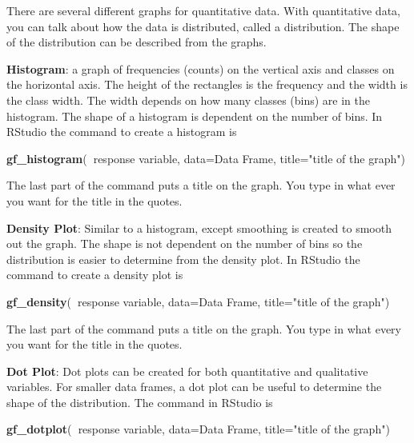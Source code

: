 \documentclass[
]{book}
\newenvironment{Shaded}{\begin{snugshade}}{\end{snugshade}}
\newcommand{\DataTypeTok}[1]{\textcolor[rgb]{0.13,0.29,0.53}{#1}}
\newcommand{\KeywordTok}[1]{\textcolor[rgb]{0.13,0.29,0.53}{\textbf{#1}}}
\newcommand{\NormalTok}[1]{#1}
\newcommand{\OperatorTok}[1]{\textcolor[rgb]{0.81,0.36,0.00}{\textbf{#1}}}
\newcommand{\StringTok}[1]{\textcolor[rgb]{0.31,0.60,0.02}{#1}}
\begin{document}
There are several different graphs for quantitative data. With quantitative data, you can talk about how the data is distributed, called a distribution. The shape of the distribution can be described from the graphs.

\textbf{Histogram}: a graph of frequencies (counts) on the vertical axis and classes on the horizontal axis. The height of the rectangles is the frequency and the width is the class width. The width depends on how many classes (bins) are in the histogram. The shape of a histogram is dependent on the number of bins. In RStudio the command to create a histogram is

\begin{Shaded}
\begin{Highlighting}[]
\KeywordTok{gf_histogram}\NormalTok{(}\OperatorTok{~}\NormalTok{response variable, }\DataTypeTok{data=}\NormalTok{Data Frame, }\DataTypeTok{title=}\StringTok{"title }
\StringTok{of the graph"}\NormalTok{)}
\end{Highlighting}
\end{Shaded}

The last part of the command puts a title on the graph. You type in what ever you want for the title in the quotes.

\textbf{Density Plot}: Similar to a histogram, except smoothing is created to smooth out the graph. The shape is not dependent on the number of bins so the distribution is easier to determine from the density plot. In RStudio the command to create a density plot is

\begin{Shaded}
\begin{Highlighting}[]
\KeywordTok{gf_density}\NormalTok{(}\OperatorTok{~}\NormalTok{response variable, }\DataTypeTok{data=}\NormalTok{Data Frame, }\DataTypeTok{title=}\StringTok{"title of the graph"}\NormalTok{)}
\end{Highlighting}
\end{Shaded}

The last part of the command puts a title on the graph. You type in what every you want for the title in the quotes.

\textbf{Dot Plot}: Dot plots can be created for both quantitative and qualitative variables. For smaller data frames, a dot plot can be useful to determine the shape of the distribution. The command in RStudio is

\begin{Shaded}
\begin{Highlighting}[]
\KeywordTok{gf_dotplot}\NormalTok{(}\OperatorTok{~}\NormalTok{response variable, }\DataTypeTok{data=}\NormalTok{Data Frame, }\DataTypeTok{title=}\StringTok{"title }
\StringTok{of the graph"}\NormalTok{)}
\end{Highlighting}
\end{Shaded}
\end{document}
